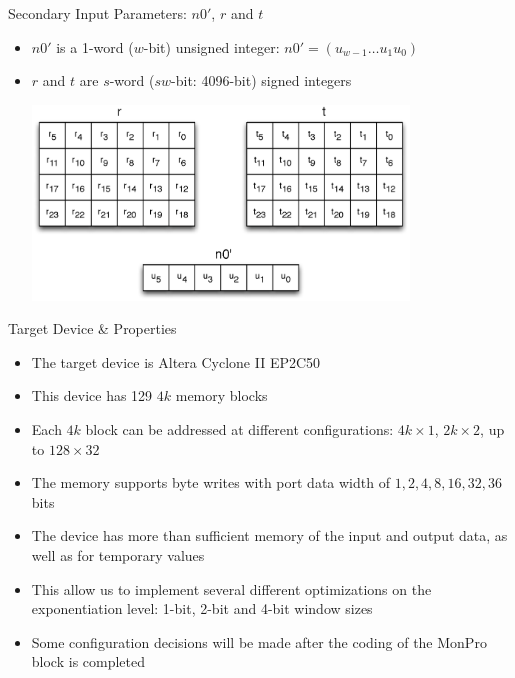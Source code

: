 \documentclass[xcolor=dvipsnames]{beamer}
\begin{document}
\begin{frame}{Secondary Input Parameters: $n0'$, $r$ and $t$}
\begin{itemize}

\item $n0'$ is a 1-word ($w$-bit) unsigned integer: $n0'=(u_{w-1}\ldots u_1u_0)$
\item $r$ and $t$ are $s$-word ($sw$-bit: 4096-bit) signed integers 

\centerline{\includegraphics[width=10cm]{secondary.eps}}

\end{itemize}
\end{frame}

\begin{frame}{Target Device \& Properties}
\begin{itemize}

\item The target device is Altera Cyclone II EP2C50
\item This device has 129 $4k$ memory blocks
\item Each $4k$ block can be addressed at different configurations:
$4k\times 1$, $2k\times 2$, up to $128 \times 32$
\item The memory supports byte writes with port data width of
$1,2,4,8,16,32,36$ bits

\item The device has more than sufficient memory of the input and output 
data, as well as for temporary values
\item This allow us to implement several different optimizations on 
the exponentiation level: 1-bit, 2-bit and 4-bit window sizes

\item Some configuration decisions will be made after the coding of the
MonPro block is completed

\end{itemize}
\end{frame}
\end{document}
